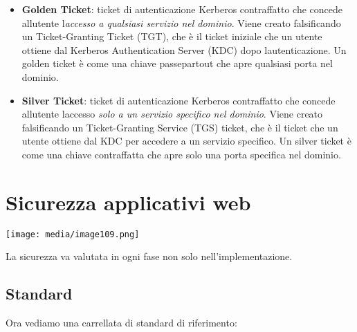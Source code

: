 \begin{itemize}
\item
  \textbf{Golden Ticket}: ticket di autenticazione Kerberos contraffatto
  che concede all\textquotesingle utente
  l\textquotesingle{}\emph{accesso a qualsiasi servizio nel dominio}.
  Viene creato falsificando un Ticket-Granting Ticket (TGT), che è il
  ticket iniziale che un utente ottiene dal Kerberos Authentication
  Server (KDC) dopo l\textquotesingle autenticazione. Un golden ticket è
  come una chiave passepartout che apre qualsiasi porta nel dominio.
\item
  \textbf{Silver Ticket}: ticket di autenticazione Kerberos contraffatto
  che concede all\textquotesingle utente l\textquotesingle accesso
  \emph{solo a un servizio specifico nel dominio}. Viene creato
  falsificando un Ticket-Granting Service (TGS) ticket, che è il ticket
  che un utente ottiene dal KDC per accedere a un servizio specifico. Un
  silver ticket è come una chiave contraffatta che apre solo una porta
  specifica nel dominio.
\end{itemize}

\section{Sicurezza applicativi web}\label{sicurezza-applicativi-web}

\texttt{[image: media/image109.png]}

La sicurezza va valutata in ogni fase non solo nell'implementazione.

\subsection{Standard}\label{standard}

Ora vediamo una carrellata di standard di riferimento:

